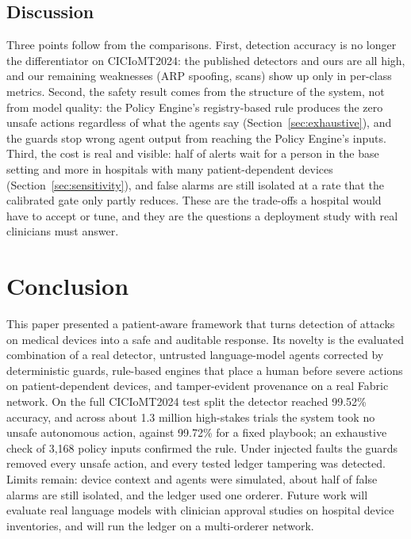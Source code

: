 \documentclass[preprint,12pt]{elsarticle}
\begin{document}
\subsection{Discussion}
\label{sec:compare-disc}
Three points follow from the comparisons. First, detection accuracy is no longer the differentiator on CICIoMT2024: the published detectors and ours are all high, and our remaining weaknesses (ARP spoofing, scans) show up only in per-class metrics. Second, the safety result comes from the structure of the system, not from model quality: the Policy Engine's registry-based rule produces the zero unsafe actions regardless of what the agents say (Section~\ref{sec:exhaustive}), and the guards stop wrong agent output from reaching the Policy Engine's inputs. Third, the cost is real and visible: half of alerts wait for a person in the base setting and more in hospitals with many patient-dependent devices (Section~\ref{sec:sensitivity}), and false alarms are still isolated at a rate that the calibrated gate only partly reduces. These are the trade-offs a hospital would have to accept or tune, and they are the questions a deployment study with real clinicians must answer.

\section{Conclusion}
\label{sec:conclusion}
This paper presented a patient-aware framework that turns detection of attacks on medical devices into a safe and auditable response. Its novelty is the evaluated combination of a real detector, untrusted language-model agents corrected by deterministic guards, rule-based engines that place a human before severe actions on patient-dependent devices, and tamper-evident provenance on a real Fabric network. On the full CICIoMT2024 test split the detector reached 99.52\% accuracy, and across about 1.3 million high-stakes trials the system took no unsafe autonomous action, against 99.72\% for a fixed playbook; an exhaustive check of 3,168 policy inputs confirmed the rule. Under injected faults the guards removed every unsafe action, and every tested ledger tampering was detected. Limits remain: device context and agents were simulated, about half of false alarms are still isolated, and the ledger used one orderer. Future work will evaluate real language models with clinician approval studies on hospital device inventories, and will run the ledger on a multi-orderer network.
\end{document}
